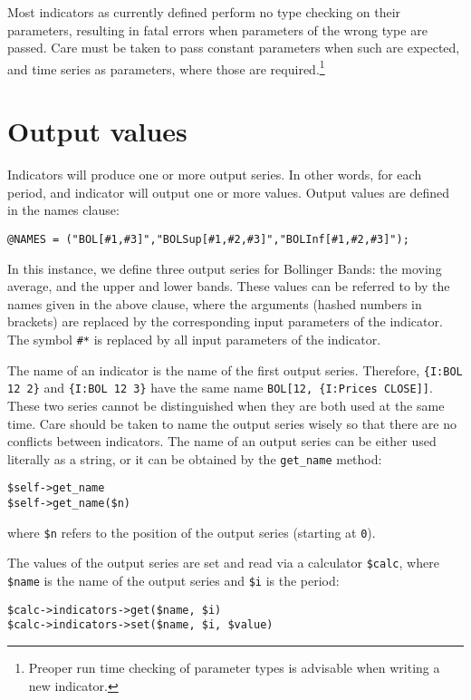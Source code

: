 \documentclass[11pt,twoside]{article}
\begin{document}
Most indicators as currently defined perform no type checking on their
parameters, resulting in fatal errors when parameters of the wrong type
are passed. Care must be taken to pass constant parameters when such are
expected, and time series as parameters, where those are required.\footnote{Preoper
run time checking of parameter types is advisable when writing a new
indicator.}

\section[Output values]{\label{bkm:Ref192524690}Output values}
Indicators will produce one or more output series. In other words, for
each period, and indicator will output one or more values. Output
values are defined in the names clause:

\begin{lstlisting}[name=example]
@NAMES = ("BOL[#1,#3]","BOLSup[#1,#2,#3]","BOLInf[#1,#2,#3]");
\end{lstlisting}
In this instance, we define three output series for Bollinger Bands: the
moving average, and the upper and lower bands. These values can be
referred to by the names given in the above clause, where the arguments
(hashed numbers in brackets) are replaced by the corresponding input
parameters of the indicator. The symbol \lstinline!#*! is
replaced by all input parameters of the indicator.

The name of an indicator is the name of the first output series. Therefore,
\lstinline!{I:BOL 12 2}! and \lstinline!{I:BOL 12 3}! have the same name
\lstinline!BOL[12, {I:Prices CLOSE]]!. These two series cannot be distinguished
when they are both used at the same time. Care should be taken to name
the output series wisely so that there are no conflicts between indicators.
The name of an output series can be either used literally as a string, or it
can be obtained by the \lstinline!get_name! method:
\begin{lstlisting}[numbers=none]
$self->get_name
$self->get_name($n)
\end{lstlisting}
where \lstinline!$n! refers to the position of the output series (starting at \lstinline!0!).


The values of the output series are set and read via a calculator
\lstinline!$calc!, where \lstinline!$name! is the
name of the output series and \lstinline!$i! is the period:
\begin{lstlisting}[numbers=none]
$calc->indicators->get($name, $i)
$calc->indicators->set($name, $i, $value)
\end{lstlisting}
\end{document}
